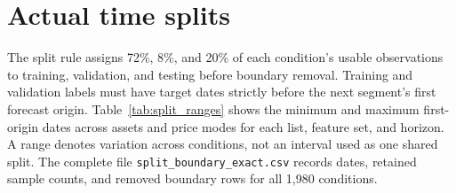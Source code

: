 \section{Actual time splits}

The split rule assigns 72\%, 8\%, and 20\% of each condition's usable observations to training, validation, and testing before boundary removal. Training and validation labels must have target dates strictly before the next segment's first forecast origin. Table~\ref{tab:split_ranges} shows the minimum and maximum first-origin dates across assets and price modes for each list, feature set, and horizon. A range denotes variation across conditions, not an interval used as one shared split. The complete file \texttt{split\_boundary\_exact.csv} records dates, retained sample counts, and removed boundary rows for all 1,980 conditions.


\FloatBarrier
